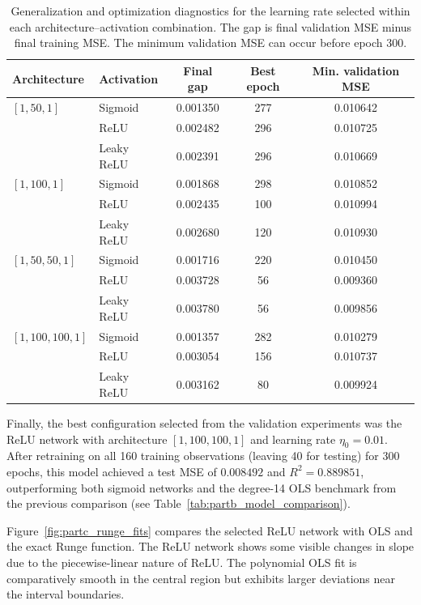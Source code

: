 \documentclass[aps,rmp,reprint,amsmath,amssymb,graphicx,longbibliography]{revtex4-1}
\begin{document}
\begin{table}[t]
 \centering
 \caption{Generalization and optimization diagnostics for the learning
 rate selected within each architecture--activation combination. The
 gap is final validation MSE minus final training MSE. The minimum
 validation MSE can occur before epoch 300.}
 \label{tab:partc_diagnostics}
 \begin{ruledtabular}
 \begin{tabular}{llccc} %
 Architecture & Activation & Final gap & Best epoch & Min. validation MSE \\
 \hline
 $[1,50,1]$ & Sigmoid & 0.001350 & 277 & 0.010642 \\
                & ReLU & 0.002482 & 296 & 0.010725 \\
                & Leaky ReLU & 0.002391 & 296 & 0.010669 \\
 $[1,100,1]$ & Sigmoid & 0.001868 & 298 & 0.010852 \\
                & ReLU & 0.002435 & 100 & 0.010994 \\
                & Leaky ReLU & 0.002680 & 120 & 0.010930 \\
 $[1,50,50,1]$ & Sigmoid & 0.001716 & 220 & 0.010450 \\
                & ReLU & 0.003728 & 56 & 0.009360 \\
                & Leaky ReLU & 0.003780 & 56 & 0.009856 \\
 $[1,100,100,1]$ & Sigmoid & 0.001357 & 282 & 0.010279 \\
                & ReLU & 0.003054 & 156 & 0.010737 \\
                & Leaky ReLU & 0.003162 & 80 & 0.009924 \\
 \end{tabular}
 \end{ruledtabular}
\end{table}

Finally, the best configuration selected from the validation
experiments was the ReLU network with architecture
$[1,100,100,1]$ and learning rate $\eta_0=0.01$.
After retraining on all 160 training observations (leaving 40 for testing) for 300
epochs, this model achieved a test MSE of $0.008492$ and
$R^2=0.889851$, outperforming both sigmoid networks and the degree-14 OLS benchmark from the previous comparison (see Table~\ref{tab:partb_model_comparison}).

Figure~\ref{fig:partc_runge_fits} compares the selected ReLU
network with OLS and the exact Runge function. The ReLU
network shows some visible changes in
slope due to the piecewise-linear nature of ReLU.
The polynomial OLS fit is comparatively smooth in the
central region but exhibits larger deviations near the
interval boundaries. 
\end{document}
